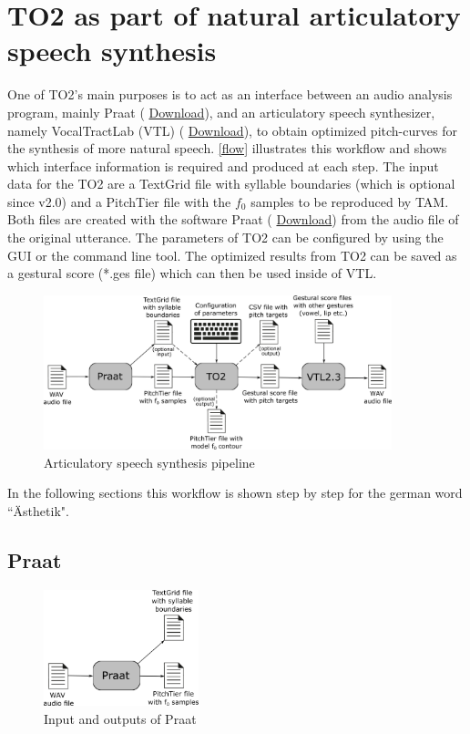 \chapter{TO2 as part of natural articulatory speech synthesis}\label{chap:synthesis}

One of TO2's main purposes is to act as an interface between an audio analysis program, mainly Praat ( \href{https://www.fon.hum.uva.nl/praat/download_win.html}{Download}), and an articulatory speech synthesizer, namely VocalTractLab (VTL) ( \href{https://www.vocaltractlab.de/index.php?page=vocaltractlab-download}{Download}), to obtain optimized pitch-curves for the synthesis of more natural speech. \autoref{flow} illustrates this workflow and shows which interface information is required and produced at each step. The input data for the TO2 are a TextGrid file with syllable boundaries (which is optional since v2.0) and a PitchTier file with the $f_{0}$ samples to be reproduced by TAM. Both files are created with the software Praat ( \href{https://www.fon.hum.uva.nl/praat/download_win.html}{Download}) from the audio file of the original utterance. The parameters of TO2 can be configured by using the GUI or the command line tool. The optimized results from TO2 can be saved as a gestural score (*.ges file) which can then be used inside of VTL.

\begin{figure}[H]
\centering
\includegraphics[width=0.9\textwidth]{images/flow.png}
\caption{
Articulatory speech synthesis pipeline}
\label{flow}
\end{figure}

In the following sections this workflow is shown step by step for the german word ``Ästhetik".

\section{Praat}

\begin{figure}[H]
\centering
\includegraphics[width=0.4\textwidth]{images/3_11.png}
\caption{Input and outputs of Praat}
\label{3_11}
\end{figure}

